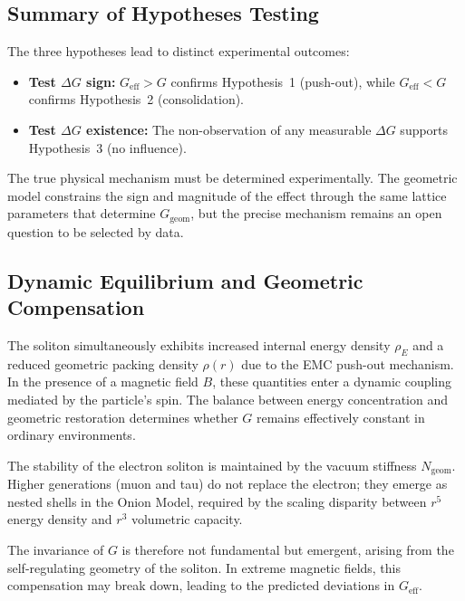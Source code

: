 \documentclass[10pt,a4paper]{article}
\begin{document}
\subsection{Summary of Hypotheses Testing}
\label{sec:hypotheses_summary_testing}

The three hypotheses lead to distinct experimental outcomes:

\begin{itemize}
	\item \textbf{Test \(\Delta G\) sign:}
	\(G_{\text{eff}} > G\) confirms Hypothesis~1 (push-out),
	while \(G_{\text{eff}} < G\) confirms Hypothesis~2 (consolidation).
	
	\item \textbf{Test \(\Delta G\) existence:}
	The non-observation of any measurable \(\Delta G\)
	supports Hypothesis~3 (no influence).
\end{itemize}

The true physical mechanism must be determined experimentally. The geometric model constrains the sign and magnitude of the effect through the same lattice parameters that determine \(G_{\text{geom}}\), but the precise mechanism remains an open question to be selected by data.

\subsection{Dynamic Equilibrium and Geometric Compensation}
\label{sec:dynamic_equilibrium}

The soliton simultaneously exhibits increased internal energy density \(\rho_E\) and a reduced geometric packing density \(\rho(r)\) due to the EMC push-out mechanism. In the presence of a magnetic field \(B\), these quantities enter a dynamic coupling mediated by the particle's spin. The balance between energy concentration and geometric restoration determines whether \(G\) remains effectively constant in ordinary environments.

The stability of the electron soliton is maintained by the vacuum stiffness \(N_{\text{geom}}\). Higher generations (muon and tau) do not replace the electron; they emerge as nested shells in the Onion Model, required by the scaling disparity between \(r^5\) energy density and \(r^3\) volumetric capacity.

The invariance of \(G\) is therefore not fundamental but emergent, arising from the self-regulating geometry of the soliton. In extreme magnetic fields, this compensation may break down, leading to the predicted deviations in \(G_{\text{eff}}\).
\end{document}

